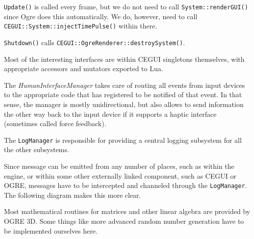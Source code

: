 {\tt Update()} is called every frame, but we do not need to call {\tt System::renderGUI()} since Ogre does this automatically. We do, however, need to call {\tt CEGUI::System::injectTimePulse()} within there.

{\tt Shutdown()} calls {\tt CEGUI::OgreRenderer::destroySystem()}.

Most of the interesting interfaces are within CEGUI singletons themselves, with appropriate accessors and mutators exported to Lua.

    {}

\page 
{}
The {\it HumanInterfaceManager} takes care of routing all events from input devices to the appropriate code that has registered to be notified of that event. In that sense, the manager is mostly unidirectional, but also allows to send information the other way back to the input device if it supports a haptic interface (sometimes called force feedback).

    {}

\page 
{}
The {\tt LogManager} is responsible for providing a central logging subsystem for all the other subsystems.

    {}
    
Since message can be emitted from any number of places, such as within the engine, or within some other externally linked component, such as CEGUI or OGRE, messages have to be intercepted and channeled through the {\tt LogManager}. The following diagram makes this more clear.

    {}

\page 
{}
Most mathematical routines for matrices and other linear algebra are provided by OGRE 3D. Some things like more advanced random number generation have to be implemented ourselves here.

    {}


